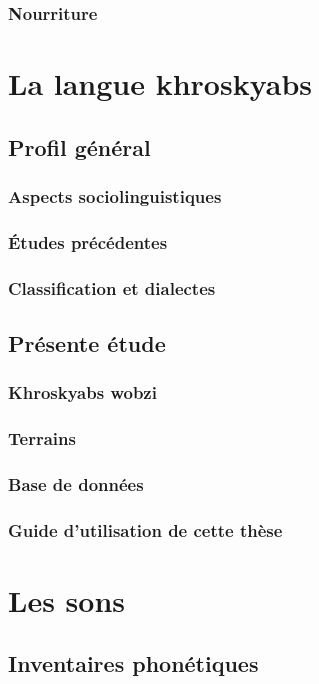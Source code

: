 \documentclass[11pt, a4paper]{book}              %
\begin{document}
\section{Nourriture}

\part{La langue khroskyabs}
\chapter{Profil général}
\section{Aspects sociolinguistiques}
\section{Études précédentes}
\section{Classification et dialectes} 
\chapter{Présente étude}
\section{Khroskyabs wobzi}
\section{Terrains}
\section{Base de données}
\section{Guide d'utilisation de cette thèse}

\part{Les sons}
\chapter{Inventaires phonétiques}
\end{document}
